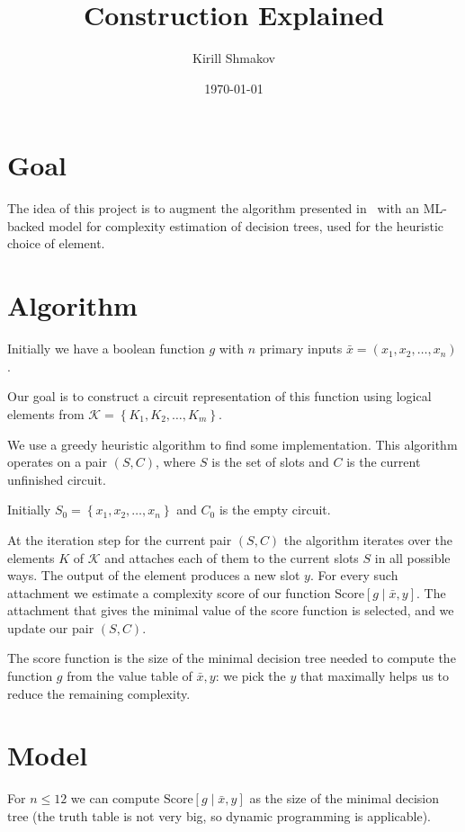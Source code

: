 \documentclass[11pt]{article}
\title{Construction Explained}
\author{Kirill Shmakov}
\date{\today}
\begin{document}
\maketitle

\section{Goal}

The idea of this project is to augment the algorithm presented
in~\cite{rokach2013mlcircuit} with an ML-backed model for complexity estimation
of decision trees, used for the heuristic choice of element.

\section{Algorithm}

Initially we have a boolean function $g$ with $n$ primary inputs $\bar{x} = \left(x_1, x_2, \dots, x_n\right)$.

Our goal is to construct a circuit representation of this function using logical
elements from $\mathcal{K} = \left\{ K_1, K_2, \dots, K_m \right\}$.

We use a greedy heuristic algorithm to find some implementation. This algorithm operates
on a pair $(S, C)$, where $S$ is the set of slots and $C$ is the current unfinished
circuit.

Initially $S_0 = \left\{x_1, x_2, \dots, x_n\right\}$ and $C_0$ is the empty
circuit.

At the iteration step for the current pair $(S, C)$ the algorithm iterates over the
elements $K$ of $\mathcal{K}$ and attaches each of them to the current slots $S$ in
all possible ways. The output of the element produces a new slot $y$. For every such
attachment we estimate a complexity score of our function $\text{Score}\left[g \mid \bar{x}, y\right]$.
The attachment that gives the minimal value of the score function is selected, and we
update our pair $(S, C)$.

The score function is the size of the minimal decision tree needed to compute the
function $g$ from the value table of $\bar{x}, y$: we pick the $y$ that maximally
helps us to reduce the remaining complexity.

\section{Model}

For $n \leqslant 12$ we can compute $\text{Score}\left[g \mid \bar{x}, y\right]$ as the size
of the minimal decision tree (the truth table is not very big, so dynamic programming
is applicable).
\end{document}
